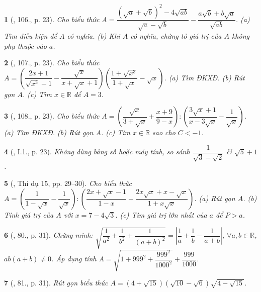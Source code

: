 \documentclass{article}
\newtheorem{baitoan}{}%
\begin{document}
\begin{baitoan}[\cite{SBT_Toan_9_tap_1}, 106., p. 23]
	Cho biểu thức $A = \dfrac{(\sqrt{a} + \sqrt{b})^2 - 4\sqrt{ab}}{\sqrt{a} - \sqrt{b}} - \dfrac{a\sqrt{b} + b\sqrt{a}}{\sqrt{ab}}$. (a) Tìm điều kiện để $A$ có nghĩa. (b) Khi $A$ có nghĩa, chứng tỏ giá trị của $A$ không phụ thuộc vào $a$.
\end{baitoan}

\begin{baitoan}[\cite{SBT_Toan_9_tap_1}, 107., p. 23]
	Cho biểu thức $A = \left(\dfrac{2x + 1}{\sqrt{x^3} - 1} - \dfrac{\sqrt{x}}{x + \sqrt{x} + 1}\right)\left(\dfrac{1 + \sqrt{x^3}}{1 + \sqrt{x}} - \sqrt{x}\right)$. (a) Tìm ĐKXĐ. (b) Rút gọn $A$. (c) Tìm $x\in\mathbb{R}$ để $A = 3$.
\end{baitoan}

\begin{baitoan}[\cite{SBT_Toan_9_tap_1}, 108., p. 23]
	Cho biểu thức $A = \left(\dfrac{\sqrt{x}}{3 + \sqrt{x}} + \dfrac{x + 9}{9 - x}\right):\left(\dfrac{3\sqrt{x} + 1}{x - 3\sqrt{x}} - \dfrac{1}{\sqrt{x}}\right)$. (a) Tìm ĐKXĐ. (b) Rút gọn $A$. (c) Tìm $x\in\mathbb{R}$ sao cho $C < -1$.
\end{baitoan}

\begin{baitoan}[\cite{SBT_Toan_9_tap_1}, I.1., p. 23]
	Không dùng bảng số hoặc máy tính, so sánh $\dfrac{1}{\sqrt{3} - \sqrt{2}}$ \& $\sqrt{5} + 1$.
\end{baitoan}

\begin{baitoan}[\cite{Tuyen_Toan_9_old}, Thí dụ 15, pp. 29--30]
	Cho biểu thức $A = \left(\dfrac{1}{1 - \sqrt{x}} - \dfrac{1}{\sqrt{x}}\right):\left(\dfrac{2x + \sqrt{x} - 1}{1 - x} + \dfrac{2x\sqrt{x} + x - \sqrt{x}}{1 + x\sqrt{x}}\right)$. (a) Rút gọn $A$. (b) Tính giá trị của $A$ với $x = 7 - 4\sqrt{3}$. (c) Tìm giá trị lớn nhất của $a$ để $P > a$.
\end{baitoan}

\begin{baitoan}[\cite{Tuyen_Toan_9_old}, 80., p. 31]
	Chứng minh: $\sqrt{\dfrac{1}{a^2} + \dfrac{1}{b^2} + \dfrac{1}{(a + b)^2}} = \left|\dfrac{1}{a} + \dfrac{1}{b} - \dfrac{1}{a + b}\right|$, $\forall a,b\in\mathbb{R}$, $ab(a + b)\ne0$. Áp dụng tính $A = \sqrt{1 + 999^2 + \dfrac{999^2}{1000^2}} + \dfrac{999}{1000}$.
\end{baitoan}

\begin{baitoan}[\cite{Tuyen_Toan_9_old}, 81., p. 31]
	Rút gọn biểu thức $A = (4 + \sqrt{15})(\sqrt{10} - \sqrt{6})\sqrt{4 - \sqrt{15}}$.
\end{baitoan}
\end{document}
